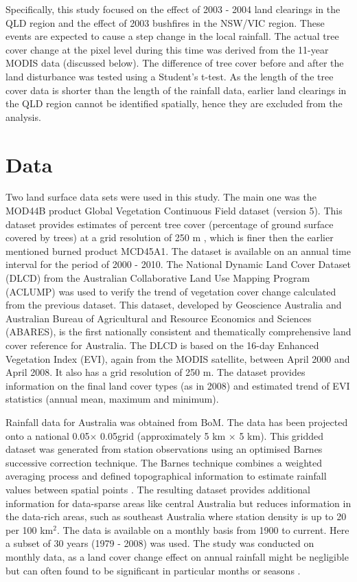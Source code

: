 \documentclass[draft,linenumbers]{agujournal}
\begin{document}
Specifically, this study focused on the effect of 2003 - 2004 land clearings in the QLD region and the effect of 2003 bushfires in the NSW/VIC region. These events are expected to cause a step change in the local rainfall. The actual tree cover change at the pixel level during this time was derived from the 11-year MODIS data (discussed below). The difference of tree cover before and after the land disturbance was tested using a Student's t-test. As the length of the tree cover data is shorter than the length of the rainfall data, earlier land clearings in the QLD region cannot be identified spatially, hence they are excluded from the analysis.

\section{Data}
\label{sec:Data}

Two land surface data sets were used in this study. The main one was the MOD44B product Global Vegetation Continuous Field dataset (version 5). This dataset provides estimates of percent tree cover (percentage of ground surface covered by trees) at a grid resolution of 250 m \citep{Townshend2011}, which is finer then the earlier mentioned burned product MCD45A1. The dataset is available on an annual time interval for the period of 2000 - 2010. The National Dynamic Land Cover Dataset (DLCD) \citep{Lymburner2010} from the Australian Collaborative Land Use Mapping Program (ACLUMP) was used to verify the trend of vegetation cover change calculated from the previous dataset. This dataset, developed by Geoscience Australia and Australian Bureau of Agricultural and Resource Economics and Sciences (ABARES), is the first nationally consistent and thematically comprehensive land cover reference for Australia. The DLCD is based on the 16-day Enhanced Vegetation Index (EVI), again from the MODIS satellite, between April 2000 and April 2008. It also has a grid resolution of 250 m. The dataset provides information on the final land cover types (as in 2008) and estimated trend of EVI statistics (annual mean, maximum and minimum). 

Rainfall data for Australia \citep{Jones2009} was obtained from BoM. The data has been projected onto a national 0.05\textdegree $\times$ 0.05\textdegree grid (approximately 5 km $\times$ 5 km). This gridded dataset was generated from station observations using an optimised Barnes successive correction technique. The Barnes technique combines a weighted averaging process and defined topographical information to estimate rainfall values between spatial points \citep{BoM2009}. The resulting dataset provides additional information for data-sparse areas like central Australia but reduces information in the data-rich areas, such as southeast Australia where station density is up to 20 per 100 km$^2$. The data is available on a monthly basis from 1900 to current. Here a subset of 30 years (1979 - 2008) was used. The study was conducted on monthly data, as a land cover change effect on annual rainfall might be negligible but can often found to be significant in particular months or seasons \citep[e.g.][]{Otterman1990,Gaertner2001,Semazzi2001,Oleson2004,Deo2009}. 
\end{document}
